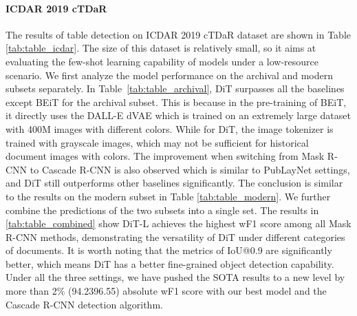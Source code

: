 \documentclass[sigconf]{acmart}
\begin{document}
\paragraph{ICDAR 2019 cTDaR}
The results of table detection on ICDAR 2019 cTDaR dataset are shown in Table \ref{tab:table_icdar}. The size of this dataset is relatively small, so it aims at evaluating the few-shot learning capability of models under a low-resource scenario. We first analyze the model performance on the archival and modern subsets separately. In Table~\ref{tab:table_archival}, DiT surpasses all the baselines except BEiT for the archival subset. 
This is because in the pre-training of BEiT, it directly uses the DALL-E dVAE which is trained on an extremely large dataset with 400M images with different colors. While for DiT, the image tokenizer is trained with grayscale images, which may not be sufficient for historical document images with colors. The improvement when switching from Mask R-CNN to Cascade R-CNN is also observed which is similar to PubLayNet settings, and DiT still outperforms other baselines significantly. The conclusion is similar to the results on the modern subset in Table \ref{tab:table_modern}. We further combine the predictions of the two subsets into a single set. The results in \ref{tab:table_combined} show DiT-L achieves the highest wF1 score among all Mask R-CNN methods, demonstrating the versatility of DiT under different categories of documents. It is worth noting that the metrics of IoU@0.9 are significantly better, which means DiT has a better fine-grained object detection capability. Under all the three settings, we have pushed the SOTA results to a new level by more than 2\% (94.2396.55) absolute wF1 score with our best model and the Cascade R-CNN detection algorithm. 
\end{document}
